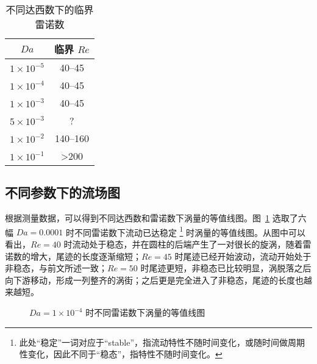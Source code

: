 \begin{table}[h]
	\caption{不同达西数下的临界雷诺数}\label{tab: critical Re}
	\vspace{.5em}\centering\wuhao
	\begin{tabular}{cc}
		\toprule[1.5pt]
		$Da$ & 临界 $Re$ \\
		\midrule[1pt]
		$1\times 10^{-5}$ & 40--45 \\
		$1\times 10^{-4}$ & 40--45 \\
		$1\times 10^{-3}$ & 40--45 \\
		$5\times 10^{-3}$ & ? \\
		$1\times 10^{-2}$ & 140--160 \\
		$1\times 10^{-1}$ & >200 \\
	\bottomrule[1.5pt]
	\end{tabular}
\end{table}

\subsection{不同参数下的流场图}

根据测量数据，可以得到不同达西数和雷诺数下涡量的等值线图。图~\ref{fig: vorticity-contour-1e-4} 选取了六幅 $Da=0.0001$ 时不同雷诺数下流动已达稳定 \footnote{此处“稳定”一词对应于“stable”，指流动特性不随时间变化，或随时间做周期性变化，因此不同于“稳态”，指特性不随时间变化。} 时涡量的等值线图。从图中可以看出，$Re=40$ 时流动处于稳态，并在圆柱的后端产生了一对很长的旋涡，随着雷诺数的增大，尾迹的长度逐渐缩短；$Re=45$ 时尾迹已经开始波动，流动开始处于非稳态，与前文所述一致；$Re=50$ 时尾迹更短，非稳态已比较明显，涡脱落之后向下游移动，形成一列整齐的涡街；之后更是完全进入了非稳态，尾迹的长度也越来越短。


\begin{figure}
	\centering
	\begin{minipage}{\textwidth}
		\centering
	\end{minipage}
	\centering
	\begin{minipage}{\textwidth}
		\centering
	\end{minipage}
	\centering
	\begin{minipage}{\textwidth}
		\centering
	\end{minipage}
	\caption{$Da=1\times 10^{-4}$ 时不同雷诺数下涡量的等值线图}
	\label{fig: vorticity-contour-1e-4}
\end{figure}

